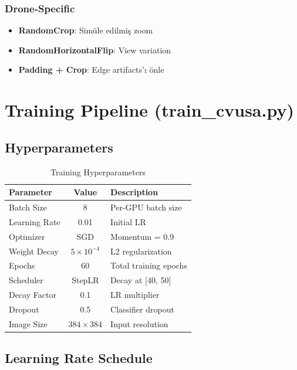 \documentclass[12pt,a4paper]{article}
\begin{document}
\subsubsection{Drone-Specific}
\begin{itemize}
    \item \textbf{RandomCrop}: Simüle edilmiş zoom
    \item \textbf{RandomHorizontalFlip}: View variation
    \item \textbf{Padding + Crop}: Edge artifacts'ı önle
\end{itemize}

\section{Training Pipeline (train\_cvusa.py)}

\subsection{Hyperparameters}

\begin{table}[h]
\centering
\begin{tabular}{|l|c|l|}
\hline
\textbf{Parameter} & \textbf{Value} & \textbf{Description} \\
\hline
Batch Size & 8 & Per-GPU batch size \\
Learning Rate & 0.01 & Initial LR \\
Optimizer & SGD & Momentum = 0.9 \\
Weight Decay & $5 \times 10^{-4}$ & L2 regularization \\
Epochs & 60 & Total training epochs \\
Scheduler & StepLR & Decay at [40, 50] \\
Decay Factor & 0.1 & LR multiplier \\
Dropout & 0.5 & Classifier dropout \\
Image Size & $384 \times 384$ & Input resolution \\
\hline
\end{tabular}
\caption{Training Hyperparameters}
\end{table}

\subsection{Learning Rate Schedule}
\end{document}
